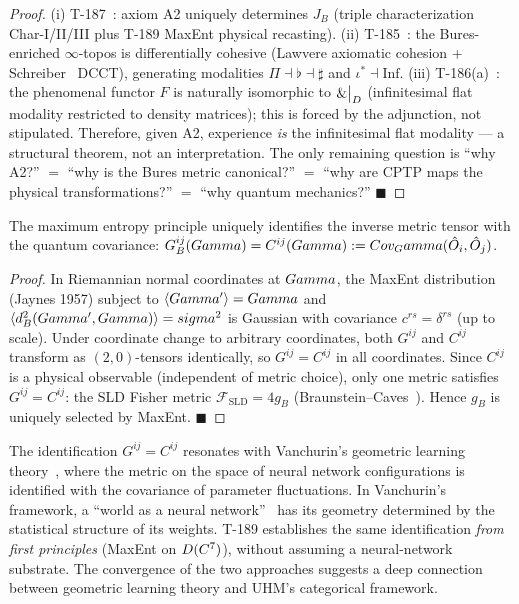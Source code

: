 \begin{proof}
(i) T-187~: axiom A2 uniquely determines $J_B$ (triple
characterization Char-I/II/III plus T-189 MaxEnt physical recasting). (ii) T-185~: the Bures-enriched
$\infty$-topos is differentially cohesive (Lawvere axiomatic cohesion +
Schreiber~\cite{schreiber2013} DCCT), generating modalities
$\Pi \dashv \flat \dashv \sharp$ and $\iota^* \dashv \mathrm{Inf}$.
(iii) T-186(a)~: the phenomenal functor $F$ is naturally
isomorphic to $\&\big|_{D}$ (infinitesimal flat modality restricted
to density matrices); this is forced by the adjunction, not stipulated.
Therefore, given A2, experience \emph{is} the infinitesimal flat
modality --- a structural theorem, not an interpretation. The only
remaining question is ``why A2?'' $=$ ``why is the Bures metric
canonical?'' $=$ ``why are CPTP maps the physical transformations?''
$=$ ``why quantum mechanics?'' $\blacksquare$
\end{proof}

\begin{theorembox}
\label{thm:t189-maxent}
The maximum entropy principle uniquely identifies the inverse metric tensor
with the quantum covariance: $G^{ij}_B(Gamma) = C^{ij}(Gamma) :=
Cov_Gamma(\hat{O}_i, \hat{O}_j)$.
\end{theorembox}

\begin{proof}
In Riemannian normal coordinates at $Gamma$, the MaxEnt distribution
(Jaynes 1957) subject to $\langle Gamma'\rangle = Gamma$ and
$\langle d_B^2(Gamma',Gamma)\rangle = sigma^2$ is Gaussian with
covariance $c^{rs} = \delta^{rs}$ (up to scale). Under coordinate
change to arbitrary coordinates, both $G^{ij}$ and $C^{ij}$ transform
as $(2,0)$-tensors identically, so $G^{ij} = C^{ij}$ in all coordinates.
Since $C^{ij}$ is a physical observable (independent of metric choice),
only one metric satisfies $G^{ij} = C^{ij}$: the SLD Fisher metric
$\mathcal{F}_{\mathrm{SLD}} = 4g_B$ (Braunstein--Caves~\cite{braunstein1994}).
Hence $g_B$ is uniquely selected by MaxEnt. $\blacksquare$
\end{proof}

\begin{remark}
The identification $G^{ij} = C^{ij}$ resonates with Vanchurin's
geometric learning theory~\cite{vanchurin2026geo}, where the metric
on the space of neural network configurations is identified with the
covariance of parameter fluctuations. In Vanchurin's framework, a
``world as a neural network''~\cite{vanchurin2020} has its geometry
determined by the statistical structure of its weights. T-189
establishes the same identification \emph{from first principles}
(MaxEnt on $D(C^7)$), without assuming a neural-network
substrate. The convergence of the two approaches suggests a deep
connection between geometric learning theory and UHM's categorical
framework.
\end{remark}

